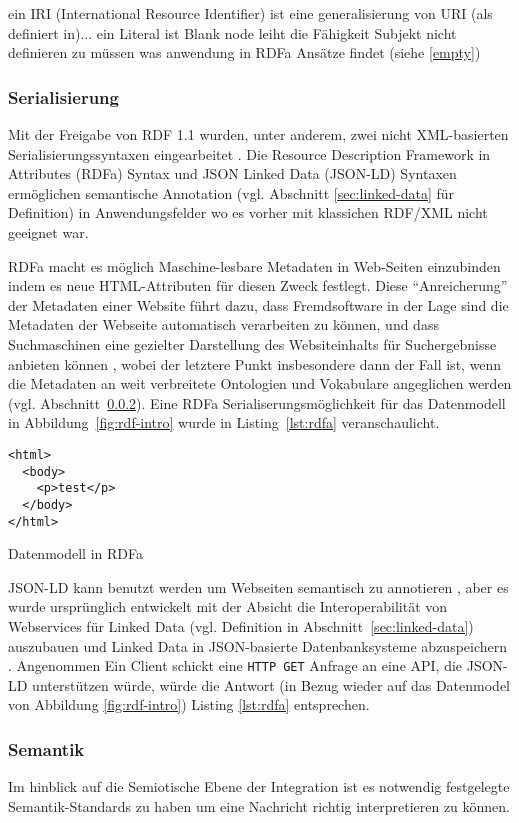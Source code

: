ein IRI (International Resource Identifier) ist eine generalisierung von URI (als definiert in)...
ein Literal ist
Blank node leiht die Fähigkeit Subjekt nicht definieren zu müssen was anwendung in RDFa Ansätze findet (siehe \ref{empty})

\subsubsection{Serialisierung}
\label{sec:serialisierung}
Mit der Freigabe von RDF 1.1 wurden, unter anderem, zwei nicht XML-basierten Serialisierungssyntaxen eingearbeitet \parencite[vgl.][Abs. 3]{Wood:14:WNR}. Die Resource Description Framework in Attributes (RDFa) Syntax und JSON Linked Data (JSON-LD) Syntaxen ermöglichen semantische Annotation (vgl. Abschnitt \ref{sec:linked-data} für Definition) in Anwendungsfelder wo es vorher mit klassichen RDF/XML nicht geeignet war. 

RDFa macht es möglich Maschine-lesbare Metadaten in Web-Seiten einzubinden indem es neue HTML-Attributen für diesen Zweck festlegt. Diese \hyphenquote{german}{Anreicherung} der Metadaten einer Website führt dazu, dass Fremdsoftware in der Lage sind die Metadaten der Webseite automatisch verarbeiten zu können, und dass Suchmaschinen eine gezielter Darstellung des Websiteinhalts für Suchergebnisse anbieten können \parencite[vgl.][Abs. 2]{Schreiber:14:RP}, wobei der letztere Punkt insbesondere dann der Fall ist, wenn die Metadaten an weit verbreitete Ontologien und Vokabulare angeglichen werden (vgl. Abschnitt~\ref{sec:semantik}). Eine RDFa Serialiserungsmöglichkeit für das Datenmodell in Abbildung~\ref{fig:rdf-intro} wurde in Listing~\ref{lst:rdfa} veranschaulicht.

\begin{listing}[H]
\begin{verbatim}
<html>
  <body>
    <p>test</p>
  </body>
</html>
\end{verbatim}
\caption{Datenmodell in RDFa}
\label{lst:rdfa}
\end{listing}

JSON-LD kann benutzt werden um Webseiten semantisch zu annotieren \parencite[vgl.]{Vincent2015}, aber es wurde ursprünglich entwickelt mit der Absicht die Interoperabilität von Webservices für Linked Data (vgl. Definition in Abschnitt~\ref{sec:linked-data}) auszubauen und Linked Data in JSON-basierte Datenbanksysteme abzuspeichern \parencite[vgl.][Abs.~1]{Lanthaler:14:J}. Angenommen Ein Client schickt eine \texttt{HTTP GET} Anfrage an eine API, die JSON-LD unterstützen würde, würde die Antwort (in Bezug wieder auf das Datenmodel von Abbildung \ref{fig:rdf-intro}) Listing \ref{lst:rdfa} entsprechen.

\subsubsection{Semantik}
\label{sec:semantik}

Im hinblick auf die Semiotische Ebene der Integration ist es notwendig festgelegte Semantik-Standards zu haben um eine Nachricht richtig interpretieren zu können.


